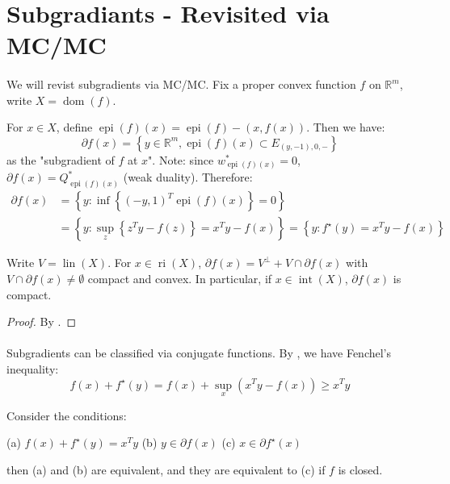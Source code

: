 \section{Subgradiants - Revisited via MC/MC}
\label{sect:046}

\paragraph{}We will revist subgradients via MC/MC. Fix a proper convex function $f$ on $\mathbb{R}^m$, write $X=\operatorname{dom}(f)$.

\begin{defn}[Subgradients]\label{defn-subgradients}
	For $x\in X$, define $\operatorname{epi}(f)(x) = \operatorname{epi}(f) - (x,f(x))$. Then we have:
	\[
		\partial f(x) = \left\{
		y\in \mathbb{R}^m,
		\operatorname{epi}(f)(x)\subset E_{(y,-1),0,-}
		\right\}
	\]
	as the "subgradient of $f$ at $x$". Note: since $w^\ast_{\operatorname{epi}(f)(x)}=0$, $\partial f(x)=Q^\ast_{\operatorname{epi}(f)(x)}$ (weak duality). Therefore:
	\begin{align*}
		\partial f(x) & =\left\{y:\inf\left\{(-y,1)^T \operatorname{epi}(f)(x)\right\}=0\right\}                                       \\
		              & =\left\{y:\sup_z \left\{ z^Ty-f(z)\right\}=x^Ty-f(x)\right\}            =\left\{y:f^\star(y)=x^Ty-f(x)\right\}
	\end{align*}
\end{defn}

\begin{prop}\label{prop:046-set-of-subgrad}
	Write $V=\operatorname{lin}(X)$. For $x\in \operatorname{ri}(X)$, $\partial f(x) = V^\perp + V\cap \partial f(x)$ with $V\cap \partial f(x)\neq\emptyset$ compact and convex. In particular, if $x\in \operatorname{int}(X)$, $\partial f(x)$ is compact.
\end{prop}
\begin{proof}
	By .
\end{proof}

\paragraph{}Subgradients can be classified via conjugate functions. By , we have Fenchel's inequality:
\[
	f(x) + f^\star(y) = f(x) + \sup_{x}(x^Ty-f(x)) \geq x^Ty
\]

\begin{prop}\label{prop:046-subgrad-conjugate}
	Consider the conditions:
	\begin{center}
		(a) $f(x) + f^\star(y) = x^Ty$ \quad (b) $y\in \partial f(x)$ \quad (c) $x\in \partial f^\star(x)$
	\end{center}
	then (a) and (b) are equivalent, and they are equivalent to (c) if $f$ is closed.
\end{prop}

